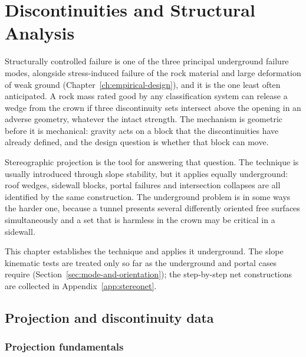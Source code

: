 \chapter{Discontinuities and Structural Analysis}
\label{ch:structural-analysis}

Structurally controlled failure is one of the three principal underground
failure modes, alongside stress-induced failure of the rock material and
large deformation of weak ground (Chapter~\ref{ch:empirical-design}), and it
is the one least often anticipated. A rock mass rated
good by any classification system can release a wedge from the crown if three
discontinuity sets intersect above the opening in an adverse
geometry, whatever the intact strength. The mechanism is
geometric before it is mechanical: gravity acts on a block that the
discontinuities have already defined, and the design question is whether that
block can move.

Stereographic projection is the tool for answering that question. The technique
is usually introduced through slope stability, but it applies equally
underground: roof wedges, sidewall blocks, portal failures and
intersection collapses are all identified by the same construction. The
underground problem is in some ways the harder one, because a tunnel presents
several differently oriented free surfaces simultaneously and a set that is
harmless in the crown may be critical in a sidewall.

This chapter establishes the technique and applies it underground. The
slope kinematic tests are treated only so far as the underground and portal
cases require (Section~\ref{sec:mode-and-orientation}); the step-by-step net
constructions are collected in Appendix~\ref{app:stereonet}.

\section{Projection and discontinuity data}
\label{sec:projection-and-data}

\subsection{Projection fundamentals}
\label{sec:projection-fundamentals}

